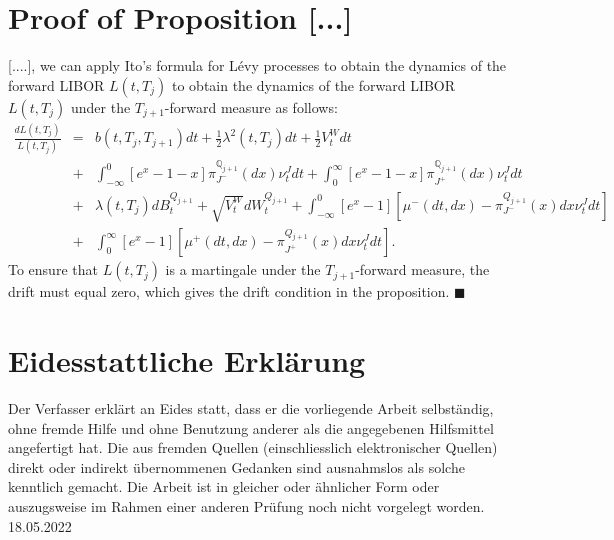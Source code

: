 \documentclass[11pt,a4paper,english,oneside]{book}
\numberwithin{equation}{chapter}
\begin{document}
\section{Proof of Proposition [...] }
[....], we can apply Ito's formula for Lévy processes   to obtain the
dynamics of the forward LIBOR $L(t,T_j)$ to obtain the
dynamics of the forward LIBOR $L(t,T_j)$ under the $T_{j+1}$-forward measure
as follows:
\begin{eqnarray}
\frac{dL(t,T_j)}{L(t,T_j)} &=& b (t,T_{j},T_{j+1}) dt +
\frac{1}{2} \lambda ^2(t,T_j) dt +
\frac{1}{2} V _t^W dt\nonumber \\
&+& \int_{-\infty}^{0}  \left[ e^{x}-1-x \right]
\pi_{J^-}^{\mathbb Q_{j+1}}(dx)\nu _t^J dt + \int_{0}^{\infty} \left[
e^{x}-1-x \right] \pi_{J^+}^{\mathbb Q_{j+1}}(dx)\nu _t^Jdt \nonumber \\
&+& \lambda (t,T_j) dB_{t}^{Q_{j+1}}+ \sqrt{ V _t^W}
dW_{t}^{Q_{j+1}}+ \int_{-\infty}^{0} \left[ e^{ x}-1 \right]
\left[ \mu^- (dt,dx) -
\pi_{J^-}^{Q_{j+1}}(x) dx \nu _t^J dt \right]\nonumber \\
&+& \int_{0}^{\infty} \left[ e^{ x}-1 \right] \left[ \mu ^+ (dt,dx)
- \pi_{J^+}^{Q_{j+1}}(x) dx \nu _t^J dt \right].
\end{eqnarray}
To ensure that $L(t,T_j)$ is a martingale under the
$T_{j+1}$-forward measure, the drift must equal zero, which gives the
drift condition in the proposition. $\blacksquare$

% 

\newpage
\thispagestyle{firststyle}
\section*{Eidesstattliche Erklärung}
Der Verfasser erklärt an Eides statt, dass er die vorliegende Arbeit selbständig, ohne fremde Hilfe und ohne Benutzung anderer als die angegebenen Hilfsmittel angefertigt hat. Die aus fremden Quellen (einschliesslich elektronischer Quellen) direkt oder indirekt übernommenen Gedanken sind ausnahmslos als solche kenntlich gemacht. Die Arbeit ist in gleicher oder ähnlicher Form oder auszugsweise im Rahmen einer anderen Prüfung noch nicht vorgelegt worden.\\[2cm]

\hspace{60pt} 18.05.2022

 \hfill {}
\end{document}
